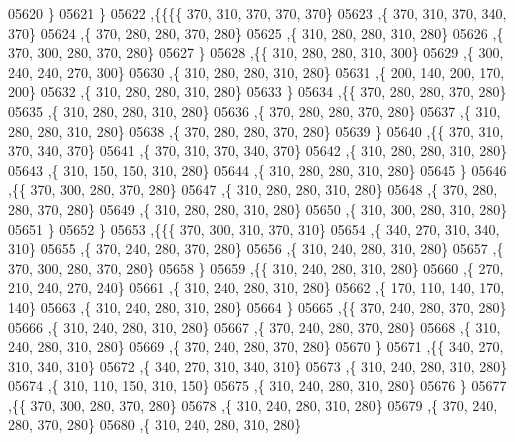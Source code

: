 \begin{DoxyCode}
05620    \}
05621   \}
05622  ,\{\{\{\{   370,   310,   370,   370,   370\}
05623     ,\{   370,   310,   370,   340,   370\}
05624     ,\{   370,   280,   280,   370,   280\}
05625     ,\{   310,   280,   280,   310,   280\}
05626     ,\{   370,   300,   280,   370,   280\}
05627     \}
05628    ,\{\{   310,   280,   280,   310,   300\}
05629     ,\{   300,   240,   240,   270,   300\}
05630     ,\{   310,   280,   280,   310,   280\}
05631     ,\{   200,   140,   200,   170,   200\}
05632     ,\{   310,   280,   280,   310,   280\}
05633     \}
05634    ,\{\{   370,   280,   280,   370,   280\}
05635     ,\{   310,   280,   280,   310,   280\}
05636     ,\{   370,   280,   280,   370,   280\}
05637     ,\{   310,   280,   280,   310,   280\}
05638     ,\{   370,   280,   280,   370,   280\}
05639     \}
05640    ,\{\{   370,   310,   370,   340,   370\}
05641     ,\{   370,   310,   370,   340,   370\}
05642     ,\{   310,   280,   280,   310,   280\}
05643     ,\{   310,   150,   150,   310,   280\}
05644     ,\{   310,   280,   280,   310,   280\}
05645     \}
05646    ,\{\{   370,   300,   280,   370,   280\}
05647     ,\{   310,   280,   280,   310,   280\}
05648     ,\{   370,   280,   280,   370,   280\}
05649     ,\{   310,   280,   280,   310,   280\}
05650     ,\{   310,   300,   280,   310,   280\}
05651     \}
05652    \}
05653   ,\{\{\{   370,   300,   310,   370,   310\}
05654     ,\{   340,   270,   310,   340,   310\}
05655     ,\{   370,   240,   280,   370,   280\}
05656     ,\{   310,   240,   280,   310,   280\}
05657     ,\{   370,   300,   280,   370,   280\}
05658     \}
05659    ,\{\{   310,   240,   280,   310,   280\}
05660     ,\{   270,   210,   240,   270,   240\}
05661     ,\{   310,   240,   280,   310,   280\}
05662     ,\{   170,   110,   140,   170,   140\}
05663     ,\{   310,   240,   280,   310,   280\}
05664     \}
05665    ,\{\{   370,   240,   280,   370,   280\}
05666     ,\{   310,   240,   280,   310,   280\}
05667     ,\{   370,   240,   280,   370,   280\}
05668     ,\{   310,   240,   280,   310,   280\}
05669     ,\{   370,   240,   280,   370,   280\}
05670     \}
05671    ,\{\{   340,   270,   310,   340,   310\}
05672     ,\{   340,   270,   310,   340,   310\}
05673     ,\{   310,   240,   280,   310,   280\}
05674     ,\{   310,   110,   150,   310,   150\}
05675     ,\{   310,   240,   280,   310,   280\}
05676     \}
05677    ,\{\{   370,   300,   280,   370,   280\}
05678     ,\{   310,   240,   280,   310,   280\}
05679     ,\{   370,   240,   280,   370,   280\}
05680     ,\{   310,   240,   280,   310,   280\}

\end{DoxyCode}
